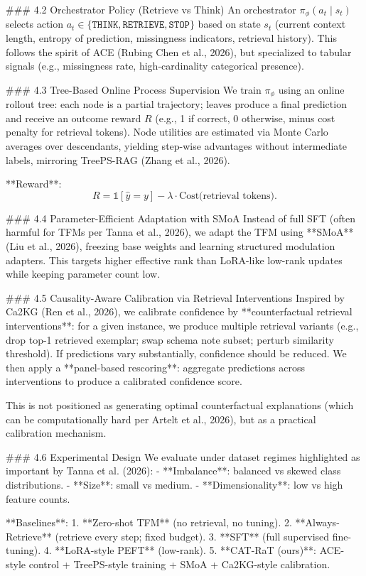 ### 4.2 Orchestrator Policy (Retrieve vs Think)  
An orchestrator \(\pi_\phi(a_t \mid s_t)\) selects action \(a_t \in \{\texttt{THINK}, \texttt{RETRIEVE}, \texttt{STOP}\}\) based on state \(s_t\) (current context length, entropy of prediction, missingness indicators, retrieval history). This follows the spirit of ACE (Rubing Chen et al., 2026), but specialized to tabular signals (e.g., missingness rate, high-cardinality categorical presence).

### 4.3 Tree-Based Online Process Supervision  
We train \(\pi_\phi\) using an online rollout tree: each node is a partial trajectory; leaves produce a final prediction and receive an outcome reward \(R\) (e.g., 1 if correct, 0 otherwise, minus cost penalty for retrieval tokens). Node utilities are estimated via Monte Carlo averages over descendants, yielding step-wise advantages without intermediate labels, mirroring TreePS-RAG (Zhang et al., 2026).

**Reward**:  
\[
R = \mathbb{1}[\hat{y}=y] - \lambda \cdot \text{Cost(retrieval tokens)}.
\]

### 4.4 Parameter-Efficient Adaptation with SMoA  
Instead of full SFT (often harmful for TFMs per Tanna et al., 2026), we adapt the TFM using **SMoA** (Liu et al., 2026), freezing base weights and learning structured modulation adapters. This targets higher effective rank than LoRA-like low-rank updates while keeping parameter count low.

### 4.5 Causality-Aware Calibration via Retrieval Interventions  
Inspired by Ca2KG (Ren et al., 2026), we calibrate confidence by **counterfactual retrieval interventions**: for a given instance, we produce multiple retrieval variants (e.g., drop top-1 retrieved exemplar; swap schema note subset; perturb similarity threshold). If predictions vary substantially, confidence should be reduced. We then apply a **panel-based rescoring**: aggregate predictions across interventions to produce a calibrated confidence score.

This is not positioned as generating optimal counterfactual explanations (which can be computationally hard per Artelt et al., 2026), but as a practical calibration mechanism.

### 4.6 Experimental Design  
We evaluate under dataset regimes highlighted as important by Tanna et al. (2026):  
- **Imbalance**: balanced vs skewed class distributions.  
- **Size**: small vs medium.  
- **Dimensionality**: low vs high feature counts.

**Baselines**:  
1. **Zero-shot TFM** (no retrieval, no tuning).  
2. **Always-Retrieve** (retrieve every step; fixed budget).  
3. **SFT** (full supervised fine-tuning).  
4. **LoRA-style PEFT** (low-rank).  
5. **CAT-RaT (ours)**: ACE-style control + TreePS-style training + SMoA + Ca2KG-style calibration.

